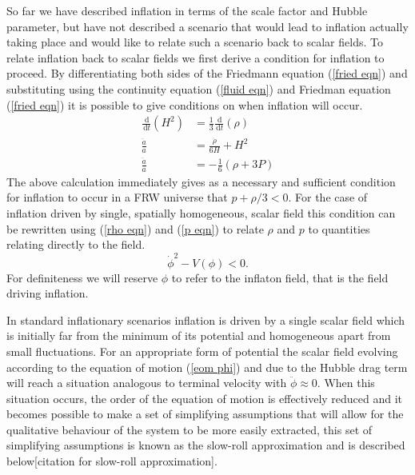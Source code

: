 \documentclass[letterpaper,11pt]{article}
\newcommand{\ud}{\,\mathrm{d}}
\begin{document}

So far we have described inflation in terms of the scale factor and Hubble parameter, but have not described a scenario that would lead to inflation actually taking place and would like to relate such a scenario back to scalar fields. To relate inflation back to scalar fields we first derive a condition for inflation to proceed. By differentiating both sides of the Friedmann equation (\ref{fried eqn}) and substituting using the continuity equation (\ref{fluid eqn}) and Friedman equation (\ref{fried eqn}) it is possible to give conditions on when inflation will occur.
\begin{align}
\frac{\ud}{\ud t}(H^2)&=\frac{1}{3}\frac{\ud}{\ud t}(\rho)\\
\frac{\ddot{a}}{a}&=\frac{\dot{\rho}}{6H}+H^2\\
\frac{\ddot{a}}{a}&=-\frac{1}{6}(\rho+3P)
\end{align}
The above calculation immediately gives as a necessary and sufficient condition for inflation to occur in a FRW universe that $p+\rho/3<0$. For the case of inflation driven by single, spatially homogeneous, scalar field this condition can be rewritten using (\ref{rho eqn}) and (\ref{p eqn}) to relate $\rho$ and $p$ to quantities relating directly to the field.
\begin{equation}
\dot{\phi}^2-V(\phi)<0. \label{inflation condition 3a}
\end{equation}
For definiteness we will reserve $\phi$ to refer to the inflaton field, that is the field driving inflation.

In standard inflationary scenarios inflation is driven by a single scalar field which is initially far from the minimum of its potential and homogeneous apart from small fluctuations. For an appropriate form of potential the scalar field evolving according to the equation of motion (\ref{eom phi}) and due to the Hubble drag term will reach a situation analogous to terminal velocity with $\ddot{\phi} \approx 0$. When this situation occurs, the order of the equation of motion is effectively reduced and it becomes possible to make a set of simplifying assumptions that will allow for the qualitative behaviour of the system to be more easily extracted, this set of simplifying assumptions is known as the slow-roll approximation and is described below[citation for slow-roll approximation].
\end{document}
